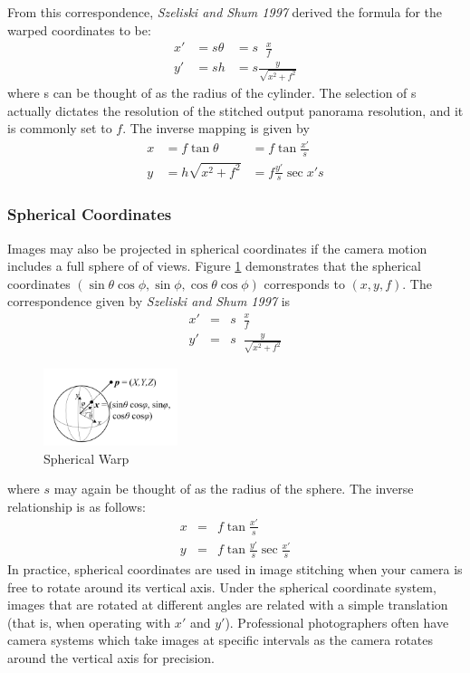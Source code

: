 \documentclass{article}
\DeclareMathOperator{\taninv}{tan^{-1}}
\begin{document}
From this correspondence, \textit{Szeliski and Shum 1997} derived the formula for the warped coordinates to be:
\begin{eqnarray*}
x' &= s\theta &= s\taninv \frac{x}{f} \\
y' &= sh &= s\frac{y}{\sqrt{x^2 + f^2}}
\end{eqnarray*}
where s can be thought of as the radius of the cylinder.
The selection of s actually dictates the resolution of the stitched output panorama resolution, and it is commonly set to $f$. The inverse mapping is given by 
\begin{eqnarray*}
x &= f\tan\theta &= f\tan \frac{x'}{s}  \\
y &= h\sqrt{x^2 + f^2} &= f\frac{y'}{s}\sec{x'}{s} 
\end{eqnarray*}

\subsubsection{Spherical Coordinates}
Images may also be projected in spherical coordinates if the camera motion includes a full sphere of of views.
Figure \ref{sphere} demonstrates that the spherical coordinates $\left( \sin\theta\cos\phi, \sin\phi, \cos\theta\cos\phi\right)$ corresponds to $\left( x, y, f \right)$.
The correspondence given by \textit{Szeliski and Shum 1997} is
\begin{eqnarray*}
x' &=& s\taninv\frac{x}{f}  \\
y' &=& s\taninv \frac{y}{\sqrt{x^2 + f^2}}
\end{eqnarray*}

\begin{figure}
  \vspace{-90pt}
  \begin{center}
    \includegraphics[width=0.35\textwidth]{sphere.png}
  \end{center}
  \caption{Spherical Warp}
  \label{sphere}
  \vspace{-50pt}
\end{figure}
where $s$ may again be thought of as the radius of the sphere. 
The inverse relationship is as follows:
\begin{eqnarray*}
x &=& f\tan\frac{x'}{s} \\
y &=& f\tan\frac{y'}{s}\sec\frac{x'}{s}
\end{eqnarray*}
In practice, spherical coordinates are used in image stitching when your camera is free to rotate around its vertical axis.
Under the spherical coordinate system, images that are rotated at different angles are related with a simple translation (that is, when operating with $x'$ and $y'$).
Professional photographers often have camera systems which take images at specific intervals as the camera rotates around the vertical axis for precision.
\end{document}
